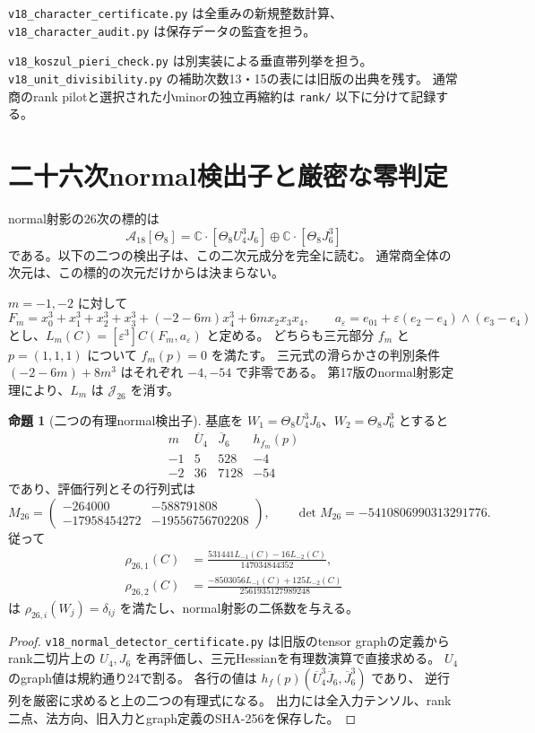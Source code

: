 \documentclass[a4paper,11pt]{ltjsarticle}
\theoremstyle{definition}
\newtheorem{proposition}[theorem]{命題}
\begin{document}
\nolinkurl{v18_character_certificate.py} は全重みの新規整数計算、
\nolinkurl{v18_character_audit.py} は保存データの監査を担う。

\nolinkurl{v18_koszul_pieri_check.py} は別実装による垂直帯列挙を担う。
\nolinkurl{v18_unit_divisibility.py} の補助次数13・15の表には旧版の出典を残す。
通常商のrank pilotと選択された小minorの独立再縮約は
\texttt{rank/} 以下に分けて記録する。



\section{二十六次normal検出子と厳密な零判定}
\label{sec:v18-normal26-detectors}

normal射影の26次の標的は
\[
 \mathcal A_{18}[\Theta_8]
 =\mathbb C\cdot[\Theta_8U_4^3J_6]\oplus\mathbb C\cdot[\Theta_8J_6^3]
\]
である。以下の二つの検出子は、この二次元成分を完全に読む。
通常商全体の次元は、この標的の次元だけからは決まらない。

$m=-1,-2$ に対して
\[
 F_m=x_0^3+x_1^3+x_2^3+x_3^3+(-2-6m)x_4^3+6mx_2x_3x_4,
 \qquad a_\varepsilon=e_{01}+\varepsilon(e_2-e_4)\wedge(e_3-e_4)
\]
とし、$L_m(C)=[\varepsilon^3]C(F_m,a_\varepsilon)$ と定める。
どちらも三元部分 $f_m$ と $p=(1,1,1)$ について $f_m(p)=0$ を満たす。
三元式の滑らかさの判別条件 $(-2-6m)+8m^3$ はそれぞれ $-4,-54$ で非零である。
第17版のnormal射影定理により、$L_m$ は $\mathcal J_{26}$ を消す。

\begin{proposition}[二つの有理normal検出子]\label{prop:v18-normal-jet-detectors}
基底を $W_1=\Theta_8U_4^3J_6$、$W_2=\Theta_8J_6^3$ とすると
\[
 \begin{array}{c|rrr}
 m&\overline U_4&\overline J_6&h_{f_m}(p)\\\hline
 -1&5&528&-4\\
 -2&36&7128&-54
 \end{array}
\]
であり、評価行列とその行列式は
\[
 M_{26}=
 \begin{pmatrix}
 -264000&-588791808\\
 -17958454272&-19556756702208
 \end{pmatrix},\qquad
 \det M_{26}=-5410806990313291776.
\]
従って
\begin{align*}
 \rho_{26,1}(C)&=
 \frac{531441L_{-1}(C)-16L_{-2}(C)}{147034844352},\\
 \rho_{26,2}(C)&=
 \frac{-8503056L_{-1}(C)+125L_{-2}(C)}{2561935127989248}
\end{align*}
は $\rho_{26,i}(W_j)=\delta_{ij}$ を満たし、normal射影の二係数を与える。
\end{proposition}
\begin{proof}
\texttt{v18\_normal\_detector\_certificate.py} は旧版のtensor graphの定義から
rank二切片上の $U_4,J_6$ を再評価し、三元Hessianを有理数演算で直接求める。
$U_4$ のgraph値は規約通り24で割る。
各行の値は $h_f(p)(\overline U_4^3\overline J_6,\overline J_6^3)$ であり、
逆行列を厳密に求めると上の二つの有理式になる。
出力には全入力テンソル、rank二点、法方向、旧入力とgraph定義のSHA-256を保存した。
\end{proof}
\end{document}
